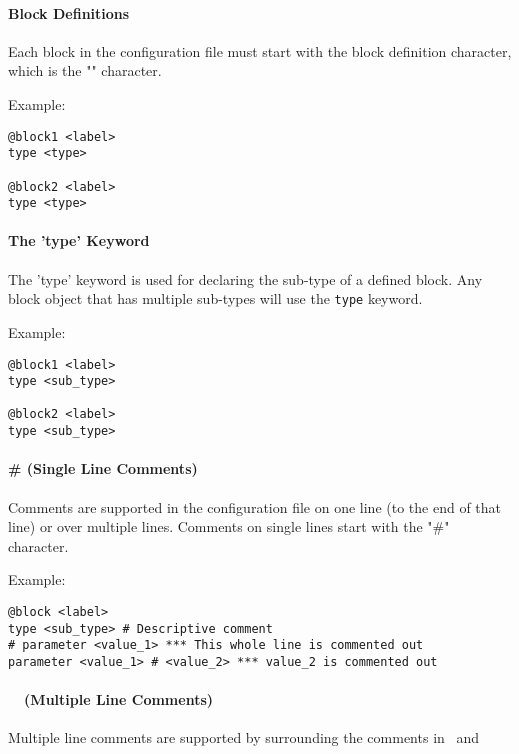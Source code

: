 \paragraph*{\command Block Definitions}

Each block in the configuration file must start with the block definition character, which is the "\command" character.

Example:

{\small{\begin{verbatim}
@block1 <label>
type <type>

@block2 <label>
type <type>
\end{verbatim}}}

\paragraph*{The 'type' Keyword}

The 'type' keyword is used for declaring the sub-type of a defined block. Any block object that has multiple sub-types will use the \texttt{type} keyword.

Example:

{\small{\begin{verbatim}
@block1 <label>
type <sub_type>

@block2 <label>
type <sub_type>
\end{verbatim}}}

\paragraph*{\# (Single Line Comments)}

Comments are supported in the configuration file on one line (to the end of that line) or over multiple lines.  Comments on single lines start with the "\#" character.

Example:

{\small{\begin{verbatim}
@block <label>
type <sub_type> # Descriptive comment
# parameter <value_1> *** This whole line is commented out
parameter <value_1> # <value_2> *** value_2 is commented out
\end{verbatim}}}

\paragraph*{\commentstart\ \commentend\ (Multiple Line Comments)}

Multiple line comments are supported by surrounding the comments in \commentstart\ and \commentend

